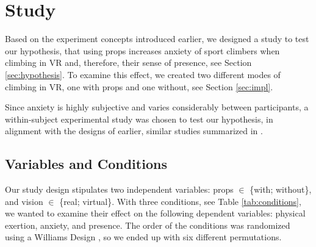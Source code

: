 \section{Study}
\label{sec:study}

Based on the experiment concepts introduced earlier, we designed a study to test our hypothesis, that using props increases anxiety of sport climbers when climbing in \gls{VR} and, therefore, their sense of presence, see Section \ref{sec:hypothesis}. To examine this effect, we created two different modes of climbing in \gls{VR}, one with props and one without, see Section \ref{sec:impl}.


Since anxiety is highly subjective and varies considerably between participants, a within-subject experimental study was chosen to test our hypothesis, in alignment with the designs of earlier, similar studies summarized in .

\subsection{Variables and Conditions}
\label{sec:variables-conditions}

Our study design stipulates two independent variables: \textbf{\sffamily {}} props $\in$ \{with; without\}, and
\textbf{\sffamily {}} vision $\in$ \{real; virtual\}. With three conditions, see Table \vref{tab:conditions}, we wanted to examine their effect on the following dependent variables: \textbf{\sffamily {}} physical exertion, \textbf{\sffamily {}} anxiety, and
\textbf{\sffamily {}} presence. The order of the conditions was randomized using a Williams Design \autocites{LatinSquaresWilliams}[based on][]{Williams1949}, so we ended up with six different permutations.

